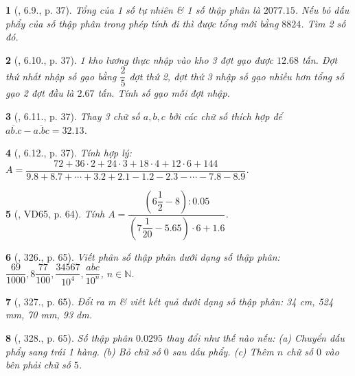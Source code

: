 \documentclass{article}
\newtheorem{baitoan}{}
\begin{document}
\begin{baitoan}[\cite{Binh_boi_duong_Toan_6_tap_2}, 6.9., p. 37]
	Tổng của 1 số tự nhiên \& 1 số thập phân là $2077.15$. Nếu bỏ dấu phẩy của số thập phân trong phép tính đi thì được tổng mới bằng $8824$. Tìm 2 số đó.
\end{baitoan}

\begin{baitoan}[\cite{Binh_boi_duong_Toan_6_tap_2}, 6.10., p. 37]
	1 kho lương thực nhập vào kho 3 đợt gạo được $12.68$ tấn. Đợt thứ nhất nhập số gạo bằng $\dfrac{2}{5}$ đợt thứ 2, đợt thứ 3 nhập số gạo nhiều hơn tổng số gạo 2 đợt đầu là $2.67$ tấn. Tính số gạo mỗi đợt nhập.
\end{baitoan}

\begin{baitoan}[\cite{Binh_boi_duong_Toan_6_tap_2}, 6.11., p. 37]
	Thay 3 chữ số $a,b,c$ bởi các chữ số thích hợp để $\overline{ab.c} - \overline{a.bc} = 32.13$.
\end{baitoan}

\begin{baitoan}[\cite{Binh_boi_duong_Toan_6_tap_2}, 6.12., p. 37]
	Tính hợp lý: $A = \dfrac{72 + 36\cdot2 + 24\cdot3 + 18\cdot4 + 12\cdot6 + 144}{9.8 + 8.7 + \cdots + 3.2 + 2.1 - 1.2 - 2.3 - \cdots - 7.8 - 8.9}$.
\end{baitoan}

\begin{baitoan}[\cite{Tuyen_Toan_6}, VD65, p. 64]
	Tính $A = \dfrac{\left(6\dfrac{1}{2} - 8\right):0.05}{\left(7\dfrac{1}{20} - 5.65\right)\cdot6 + 1.6}$.
\end{baitoan}

\begin{baitoan}[\cite{Tuyen_Toan_6}, 326., p. 65]
	Viết phân số thập phân dưới dạng số thập phân: $\dfrac{69}{1000},8\dfrac{77}{100},\dfrac{34567}{10^4},\dfrac{abc}{10^n}$, $n\in\mathbb{N}$.
\end{baitoan}

\begin{baitoan}[\cite{Tuyen_Toan_6}, 327., p. 65]
	Đổi ra {\rm m} \& viết kết quả dưới dạng số thập phân: {\rm34 cm, 524 mm, 70 mm, 93 dm}.
\end{baitoan}

\begin{baitoan}[\cite{Tuyen_Toan_6}, 328., p. 65]
	Số thập phân $0.0295$ thay đổi như thế nào nếu: (a) Chuyển dấu phẩy sang trái 1 hàng. (b) Bỏ chữ số $0$ sau dấu phẩy. (c) Thêm $n$ chữ số $0$ vào bên phải chữ số $5$.
\end{baitoan}
\end{document}
